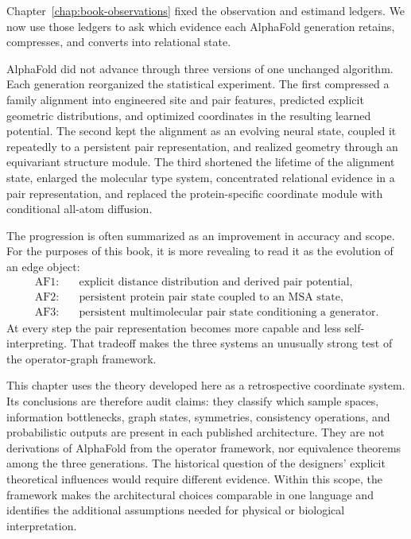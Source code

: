 Chapter~\ref{chap:book-observations} fixed the observation and estimand ledgers.  We now use those
ledgers to ask which evidence each AlphaFold generation retains, compresses, and converts into
relational state.

AlphaFold did not advance through three versions of one unchanged algorithm.  Each generation
reorganized the statistical experiment.  The first compressed a family alignment into engineered
site and pair features, predicted explicit geometric distributions, and optimized coordinates in
the resulting learned potential.  The second kept the alignment as an evolving neural state,
coupled it repeatedly to a persistent pair representation, and realized geometry through an
equivariant structure module.  The third shortened the lifetime of the alignment state, enlarged
the molecular type system, concentrated relational evidence in a pair representation, and replaced
the protein-specific coordinate module with conditional all-atom diffusion.

The progression is often summarized as an improvement in accuracy and scope.  For the purposes of
this book, it is more revealing to read it as the evolution of an edge object:
\begin{equation}
\begin{aligned}
\text{AF1:}&\quad \text{explicit distance distribution and derived pair potential},\\
\text{AF2:}&\quad \text{persistent protein pair state coupled to an MSA state},\\
\text{AF3:}&\quad \text{persistent multimolecular pair state conditioning a generator}.
\end{aligned}
\label{eq:af-generational-edge}
\end{equation}
At every step the pair representation becomes more capable and less self-interpreting.  That
tradeoff makes the three systems an unusually strong test of the operator-graph framework.

This chapter uses the theory developed here as a retrospective coordinate system.  Its conclusions
are therefore audit claims: they classify which sample spaces, information bottlenecks, graph
states, symmetries, consistency operations, and probabilistic outputs are present in each published
architecture.  They are not derivations of AlphaFold from the operator framework, nor equivalence
theorems among the three generations.  The historical question of the designers' explicit
theoretical influences would require different evidence.  Within this scope, the framework makes
the architectural choices comparable in one language and identifies the additional assumptions
needed for physical or biological interpretation.

